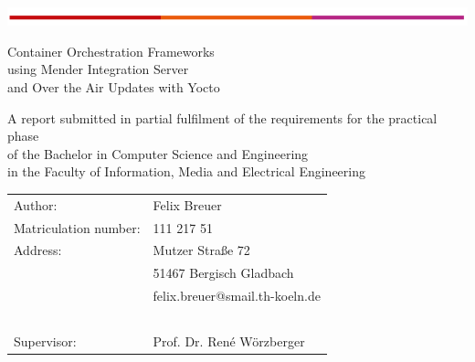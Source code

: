 \begin{titlepage}
\begin{flushleft}
	\vspace*{-1cm}
	\includegraphics[scale=1]{images/th-bar.png}\\
	\vspace*{1cm}
\end{flushleft}
\begin{center}
\begin{huge}
Container Orchestration Frameworks\\
using Mender Integration Server\\
and Over the Air Updates with Yocto\\
\end{huge}
\vspace{2cm}
A report submitted in partial fulfilment of the requirements for the practical phase \\of the Bachelor in Computer Science and Engineering \\in the Faculty of Information, Media and Electrical Engineering
\end{center}
\vspace{4cm}
\noindent\begin{tabular}{ll}
	Author: & Felix Breuer \\
	Matriculation number: &	111 217 51 \\
	Address: & Mutzer Straße 72 \\
	~ &	51467 Bergisch Gladbach \\
	~ &	felix.breuer@smail.th-koeln.de \\
	~ & ~ \\
	Supervisor: & Prof. Dr. René Wörzberger
\end{tabular}
~\\
~\\
~\\
~\\
~\\
~\\
\end{titlepage}
\newpage
